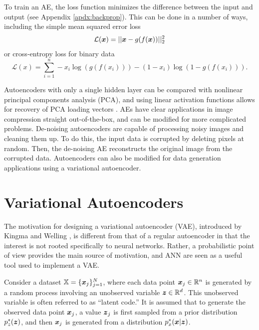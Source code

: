 To train an AE, the loss function minimizes the difference between the input and output (see Appendix \ref{apdx:backprop}). This can be done in a number of ways, including the simple mean squared error loss
\begin{equation}
  \mathcal{L}(\boldsymbol{x}) = || \boldsymbol{x} - g(f(\boldsymbol{x}))||_2^2
  \label{eq:mse}
\end{equation}
or cross-entropy loss for binary data
\begin{equation}
  \mathcal{L}(x) = \sum_{i=1}^n - x_i \log(g(f(x_i))) - (1-x_i)\log(1- g(f(x_i))).
  \label{eq:cross_entropy}
\end{equation}

Autoencoders with only a single hidden layer can be compared with nonlinear principal components analysis (PCA), and using linear activation functions allows for recovery of PCA loading vectors \cite{plaut2018}. AEs have clear applications in image compression straight out-of-the-box, and can be modified for more complicated problems. De-noising autoencoders \cite{vincent2008} are capable of processing noisy images and cleaning them up. To do this, the input data is corrupted by deleting pixels at random. Then, the de-noising AE reconstructs the original image from the corrupted data. Autoencoders can also be modified for data generation applications using a variational autoencoder.



\section{Variational Autoencoders}\label{sec:vae}

The motivation for designing a variational autoencoder (VAE), introduced by Kingma and Welling \cite{kingma2014}, is different from that of a regular autoencoder in that the interest is not rooted specifically to neural networks. Rather, a probabilistic point of view provides the main source of motivation, and ANN are seen as a useful tool used to implement a VAE.

Consider a dataset $\mathbb{X} = \{\boldsymbol{x}_j\}_{j=1}^N$, where each data point $\boldsymbol{x}_j \in \mathbb{R}^n$ is generated by a random process involving an unobserved variable $\boldsymbol{z} \in \mathbb{R}^d$. This unobserved variable is often referred to as ``latent code.'' It is assumed that to generate the observed data point $\boldsymbol{x}_j$, a value $\boldsymbol{z}_j$ is first sampled from a prior distribution $p_z^*(\boldsymbol{z})$, and then $\boldsymbol{x}_j$ is generated from a distribution $p_x^*(\boldsymbol{x} | \boldsymbol{z})$.


